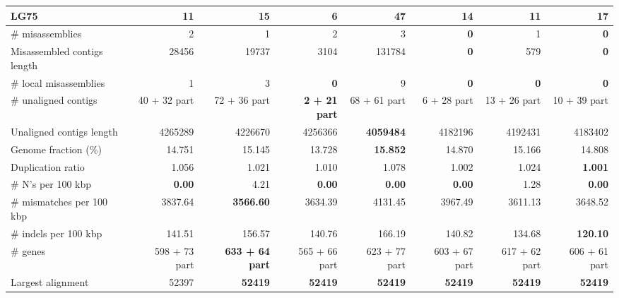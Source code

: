 \documentclass[12pt,a4paper]{article}
\begin{document}
\begin{table}[ht]
\begin{center}
\begin{tabular}{|l*{7}{|r}|}
LG75 & 11 & 15 & {\bf 6} & 47 & 14 & 11 & 17 \\ \hline
\# misassemblies & 2 & 1 & 2 & 3 & {\bf 0} & 1 & {\bf 0} \\ \hline
Misassembled contigs length & 28456 & 19737 & 3104 & 131784 & {\bf 0} & 579 & {\bf 0} \\ \hline
\# local misassemblies & 1 & 3 & {\bf 0} & 9 & {\bf 0} & {\bf 0} & {\bf 0} \\ \hline
\# unaligned contigs & 40 + 32 part & 72 + 36 part & {\bf 2 + 21 part} & 68 + 61 part & 6 + 28 part & 13 + 26 part & 10 + 39 part \\ \hline
Unaligned contigs length & 4265289 & 4226670 & 4256366 & {\bf 4059484} & 4182196 & 4192431 & 4183402 \\ \hline
Genome fraction (\%) & 14.751 & 15.145 & 13.728 & {\bf 15.852} & 14.870 & 15.166 & 14.808 \\ \hline
Duplication ratio & 1.056 & 1.021 & 1.010 & 1.078 & 1.002 & 1.024 & {\bf 1.001} \\ \hline
\# N's per 100 kbp & {\bf 0.00} & 4.21 & {\bf 0.00} & {\bf 0.00} & {\bf 0.00} & 1.28 & {\bf 0.00} \\ \hline
\# mismatches per 100 kbp & 3837.64 & {\bf 3566.60} & 3634.39 & 4131.45 & 3967.49 & 3611.13 & 3648.52 \\ \hline
\# indels per 100 kbp & 141.51 & 156.57 & 140.76 & 166.19 & 140.82 & 134.68 & {\bf 120.10} \\ \hline
\# genes & 598 + 73 part & {\bf 633 + 64 part} & 565 + 66 part & 623 + 77 part & 603 + 67 part & 617 + 62 part & 606 + 61 part \\ \hline
Largest alignment & 52397 & {\bf 52419} & {\bf 52419} & {\bf 52419} & {\bf 52419} & {\bf 52419} & {\bf 52419} \\ \hline
\end{tabular}
\end{center}
\end{table}
\end{document}
